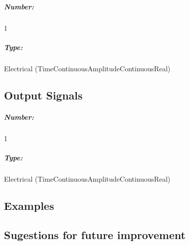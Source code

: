\subparagraph*{Number:} 1

\subparagraph*{Type:} Electrical (TimeContinuousAmplitudeContinuousReal)

\subsection*{Output Signals}

\subparagraph*{Number:} 1

\subparagraph*{Type:} Electrical (TimeContinuousAmplitudeContinuousReal)

\subsection*{Examples} 


\subsection*{Sugestions for future improvement}

